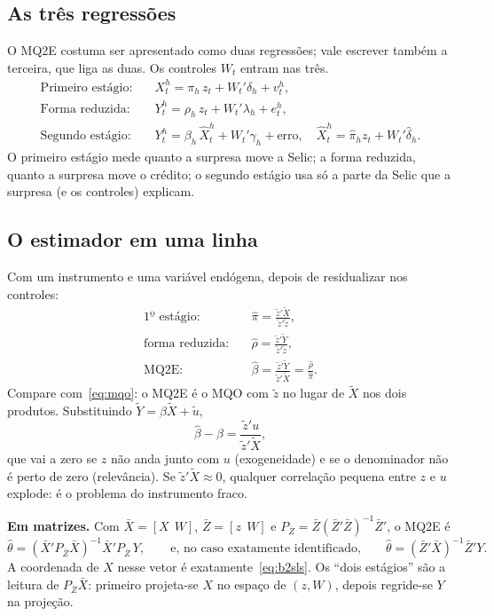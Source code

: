 \subsection{As três regressões}
O MQ2E costuma ser apresentado como duas regressões; vale escrever também a terceira, que liga as
duas. Os controles $W_t$ entram nas três.
\begin{align}
\text{Primeiro estágio:}\quad & X^h_t = \pi_h\, z_t + W_t'\delta_h + v^h_t, \label{eq:fs}\\
\text{Forma reduzida:}\quad & Y^h_t = \rho_h\, z_t + W_t'\lambda_h + e^h_t, \label{eq:rf}\\
\text{Segundo estágio:}\quad & Y^h_t = \beta_h\, \widehat{X}^h_t + W_t'\gamma_h + \text{erro},
\quad \widehat{X}^h_t = \hat\pi_h z_t + W_t'\hat\delta_h. \label{eq:ss}
\end{align}
O primeiro estágio mede quanto a surpresa move a Selic; a forma reduzida, quanto a surpresa move o
crédito; o segundo estágio usa só a parte da Selic que a surpresa (e os controles) explicam.

\subsection{O estimador em uma linha}
Com um instrumento e uma variável endógena, depois de residualizar nos controles:
\begin{align}
\text{1º estágio:}\quad & \hat\pi = \frac{\tilde z'\tilde X}{\tilde z'\tilde z}, \label{eq:pi}\\
\text{forma reduzida:}\quad & \hat\rho = \frac{\tilde z'\tilde Y}{\tilde z'\tilde z}, \label{eq:rho}\\
\text{MQ2E:}\quad & \hat\beta = \frac{\tilde z'\tilde Y}{\tilde z'\tilde X} = \frac{\hat\rho}{\hat\pi}. \label{eq:b2sls}
\end{align}
Compare com~\eqref{eq:mqo}: o MQ2E é o MQO com $\tilde z$ no lugar de $\tilde X$ nos dois
produtos. Substituindo $\tilde Y = \beta\tilde X + \tilde u$,
\begin{equation}\label{eq:erro_vi}
\hat\beta - \beta = \frac{\tilde z'u}{\tilde z'\tilde X},
\end{equation}
que vai a zero se $z$ não anda junto com $u$ (exogeneidade) e se o denominador não é perto de zero
(relevância). Se $\tilde z'\tilde X\approx0$, qualquer correlação pequena entre $z$ e $u$ explode:
é o problema do instrumento fraco.

\textbf{Em matrizes.} Com $\bar X=[X\ \ W]$, $\bar Z=[z\ \ W]$ e
$P_{\bar Z}=\bar Z(\bar Z'\bar Z)^{-1}\bar Z'$, o MQ2E é
\[
\hat\theta=(\bar X'P_{\bar Z}\bar X)^{-1}\bar X'P_{\bar Z}\,Y,
\qquad\text{e, no caso exatamente identificado,}\qquad
\hat\theta=(\bar Z'\bar X)^{-1}\bar Z'Y.
\]
A coordenada de $X$ nesse vetor é exatamente~\eqref{eq:b2sls}. Os ``dois estágios'' são a leitura de $P_{\bar Z}\bar X$: primeiro
projeta-se $X$ no espaço de $(z,W)$, depois regride-se $Y$ na projeção.

